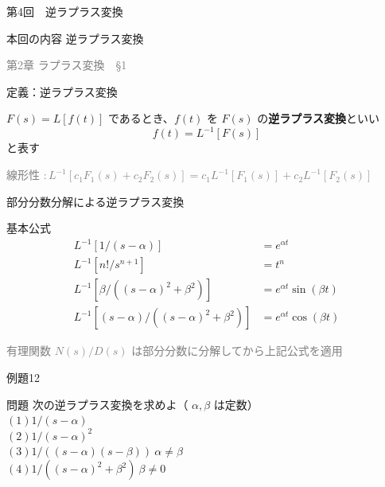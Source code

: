 \documentclass[professionalfonts]{beamer}
\begin{document}
\begin{frame}{第4回　逆ラプラス変換}
  \begin{block}{本回の内容}
  逆ラプラス変換
  \end{block}
  \vfill\hfill{\scriptsize \textcolor{gray}{第2章 ラプラス変換　§1}}
\end{frame}

\begin{frame}{定義：逆ラプラス変換}
  \begin{block}{}
  $F(s) = L[f(t)]$ であるとき、$f(t)$ を $F(s)$ の\textbf{逆ラプラス変換}といい
  \[
    f(t) = L^{-1}[F(s)]
  \]
  と表す
  \end{block}
  {\footnotesize \textcolor{gray}{線形性 $: L^{-1}[c_{1}F_{1}(s)+c_{2}F_{2}(s)] = c_{1}L^{-1}[F_{1}(s)]+c_{2}L^{-1}[F_{2}(s)]$}}
\end{frame}

\begin{frame}{部分分数分解による逆ラプラス変換}
  \begin{block}{基本公式}
  \begin{align*}
    L^{-1}[1/(s-\alpha)] &= e^{\alpha t} \\
    L^{-1}[n!/s^{n+1}] &= t^n \\
    L^{-1}[\beta/((s-\alpha)^{2}+\beta^{2})] &= e^{\alpha t}\sin(\beta t) \\
    L^{-1}[(s-\alpha)/((s-\alpha)^{2}+\beta^{2})] &= e^{\alpha t}\cos(\beta t)
  \end{align*}
  \end{block}
  {\footnotesize \textcolor{gray}{有理関数 $N(s)/D(s)$ は部分分数に分解してから上記公式を適用}}
\end{frame}

\begin{frame}{例題12}
  \begin{exampleblock}{問題}
    次の逆ラプラス変換を求めよ（ $\alpha, \beta$ は定数）\\[2pt]
    $(1) 1/(s-\alpha)$\\[2pt]
    $(2) 1/(s-\alpha)^{2}$\\[2pt]
    $(3) 1/((s-\alpha)(s-\beta)) \ \alpha \neq \beta$\\[2pt]
    $(4) 1/((s-\alpha)^{2}+\beta^{2}) \ \beta \neq 0$\\[2pt]
  \end{exampleblock}
\end{frame}
\end{document}
